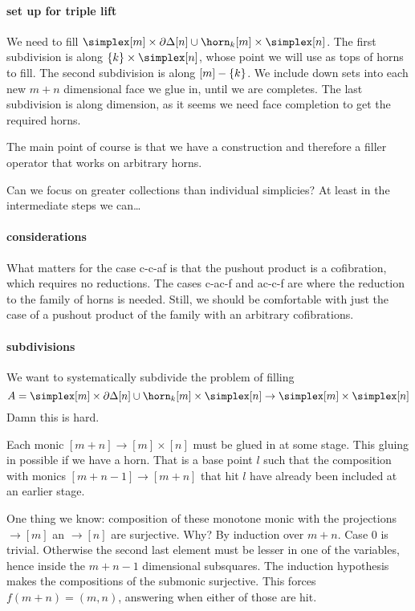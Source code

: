 \documentclass[csh.tex]{subfiles}
\begin{document}
\paragraph{set up for triple lift}
We need to fill $\simplex[m]\times \cycle[n]\cup \horn_k[m]\times\simplex[n]$. The first subdivision is along $\set{k}\times \simplex[n]$, whose point we will use as tops of horns to fill. The second subdivision is along $[m]-\left\{k\right\}$. We include down sets into each new $m+n$ dimensional face we glue in, until we are completes. The last subdivision is along dimension, as it seems we need face completion to get the required horns.

The main point of course is that we have a construction and therefore a filler operator that works on arbitrary horns.

Can we focus on greater collections than individual simplicies? At least in the intermediate steps we can\dots

\paragraph{considerations}
What matters for the case c-c-af is that the pushout product is a cofibration, which requires no reductions.
The cases c-ac-f and ac-c-f are where the reduction to the family of horns is needed.
Still, we should be comfortable with just the case of a pushout product of the family with an arbitrary cofibrations.

\paragraph{subdivisions}
We want to systematically subdivide the problem of filling
\[ A = \simplex[m]\times \cycle[n]\cup \horn_k[m]\times\simplex[n] \to \simplex[m]\times \simplex[n] \]
Damn this is hard.

Each monic $[m+n]\to [m]\times [n]$ must be glued in at some stage. This gluing in possible if we have a horn.
That is a base point $l$ such that the composition with monics $[m+n-1]\to [m+n]$ that hit $l$ have already been included at an earlier stage.

One thing we know: composition of these monotone monic with the projections $\to[m]$ an $\to[n]$ are surjective. Why?
By induction over $m+n$. Case 0 is trivial. Otherwise the second last element must be lesser in one of the variables,
hence inside the $m+n-1$ dimensional subsquares. The induction hypothesis makes the compositions of the submonic surjective. This forces $f(m+n) = (m,n)$, answering when either of those are hit.
\end{document}
